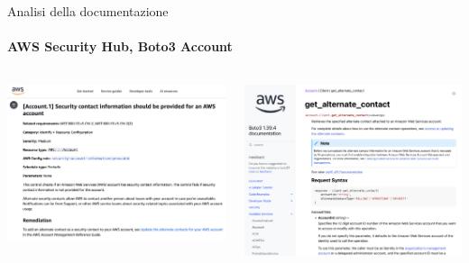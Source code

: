 \documentclass{beamer}
\begin{document}
\begin{frame}{Analisi della documentazione}
    \framesubtitle{AWS Security Hub, Boto3 Account}
    \begin{columns}
        \begin{column}{0.5\textwidth}
            \includegraphics[width=\textwidth]{assets/sechubacc.png}
        \end{column}
        \begin{column}{0.5\textwidth}
            \includegraphics[width=\textwidth]{assets/boto3acc.png}
        \end{column}
    \end{columns}
\end{frame}
\end{document}
